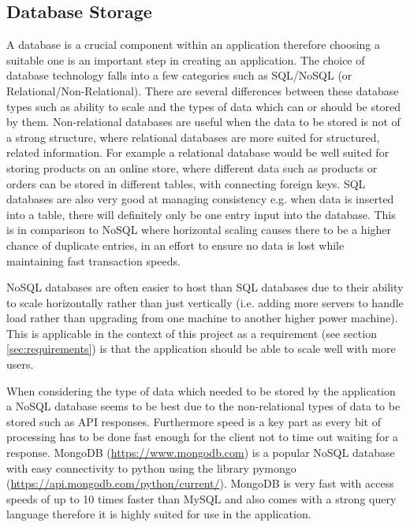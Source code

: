 \documentclass[a4paper,12pt]{report}
\begin{document}
    \subsection{Database Storage} %
      A database is a crucial component within an application therefore choosing a suitable one is an important step in creating an application. The choice of database technology falls into a few categories such as SQL/NoSQL (or Relational/Non-Relational). There are several differences between these database types such as ability to scale and the types of data which can or should be stored by them. Non-relational databases are useful when the data to be stored is not of a strong structure, where relational databases are more suited for structured, related information. For example a relational database would be well suited for storing products on an online store, where different data such as products or orders can be stored in different tables, with connecting foreign keys. SQL databases are also very good at managing consistency e.g. when data is inserted into a table, there will definitely only be one entry input into the database. This is in comparison to NoSQL where horizontal scaling causes there to be a higher chance of duplicate entries, in an effort to ensure no data is lost while maintaining fast transaction speeds.

      NoSQL databases are often easier to host than SQL databases due to their ability to scale horizontally \citep{cattell2011scalable} rather than just vertically (i.e. adding more servers to handle load rather than upgrading from one machine to another higher power machine). This is applicable in the context of this project as a requirement (see section \ref{sec:requirements}) is that the application should be able to scale well with more users.

      When considering the type of data which needed to be stored by the application a NoSQL database seems to be best due to the non-relational types of data to be stored such as API responses. Furthermore speed is a key part as every bit of processing has to be done fast enough for the client not to time out waiting for a response. MongoDB (\url{https://www.mongodb.com}) is a popular NoSQL database with easy connectivity to python using the library pymongo (\url{https://api.mongodb.com/python/current/}). MongoDB is very fast with access speeds of up to 10 times faster than MySQL \citep{han2011survey} and also comes with a strong query language therefore it is highly suited for use in the application.
\end{document}
